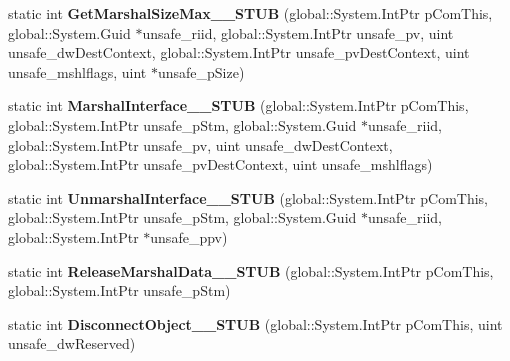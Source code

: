 \begin{DoxyCompactItemize}
static int {\bfseries Get\+Marshal\+Size\+Max\+\_\+\+\_\+\+S\+T\+UB} (global\+::\+System.\+Int\+Ptr p\+Com\+This, global\+::\+System.\+Guid $\ast$unsafe\+\_\+riid, global\+::\+System.\+Int\+Ptr unsafe\+\_\+pv, uint unsafe\+\_\+dw\+Dest\+Context, global\+::\+System.\+Int\+Ptr unsafe\+\_\+pv\+Dest\+Context, uint unsafe\+\_\+mshlflags, uint $\ast$unsafe\+\_\+p\+Size)
\item 
\mbox{\label{struct_system_1_1_runtime_1_1_interop_services_1_1_i_marshal_____system___runtime___windows_runtime_____impl_1_1_vtbl_a8ca757bdde9525e1da4e2ba60a35ffd6}} 
static int {\bfseries Marshal\+Interface\+\_\+\+\_\+\+S\+T\+UB} (global\+::\+System.\+Int\+Ptr p\+Com\+This, global\+::\+System.\+Int\+Ptr unsafe\+\_\+p\+Stm, global\+::\+System.\+Guid $\ast$unsafe\+\_\+riid, global\+::\+System.\+Int\+Ptr unsafe\+\_\+pv, uint unsafe\+\_\+dw\+Dest\+Context, global\+::\+System.\+Int\+Ptr unsafe\+\_\+pv\+Dest\+Context, uint unsafe\+\_\+mshlflags)
\item 
\mbox{\label{struct_system_1_1_runtime_1_1_interop_services_1_1_i_marshal_____system___runtime___windows_runtime_____impl_1_1_vtbl_a6325016e621765b68878de65e7fe333e}} 
static int {\bfseries Unmarshal\+Interface\+\_\+\+\_\+\+S\+T\+UB} (global\+::\+System.\+Int\+Ptr p\+Com\+This, global\+::\+System.\+Int\+Ptr unsafe\+\_\+p\+Stm, global\+::\+System.\+Guid $\ast$unsafe\+\_\+riid, global\+::\+System.\+Int\+Ptr $\ast$unsafe\+\_\+ppv)
\item 
\mbox{\label{struct_system_1_1_runtime_1_1_interop_services_1_1_i_marshal_____system___runtime___windows_runtime_____impl_1_1_vtbl_acb4ef2d5853f6ed1823d32c7939a9c80}} 
static int {\bfseries Release\+Marshal\+Data\+\_\+\+\_\+\+S\+T\+UB} (global\+::\+System.\+Int\+Ptr p\+Com\+This, global\+::\+System.\+Int\+Ptr unsafe\+\_\+p\+Stm)
\item 
\mbox{\label{struct_system_1_1_runtime_1_1_interop_services_1_1_i_marshal_____system___runtime___windows_runtime_____impl_1_1_vtbl_a190a87511db9790b75721ec9fbbf6db5}} 
static int {\bfseries Disconnect\+Object\+\_\+\+\_\+\+S\+T\+UB} (global\+::\+System.\+Int\+Ptr p\+Com\+This, uint unsafe\+\_\+dw\+Reserved)
\end{DoxyCompactItemize}
